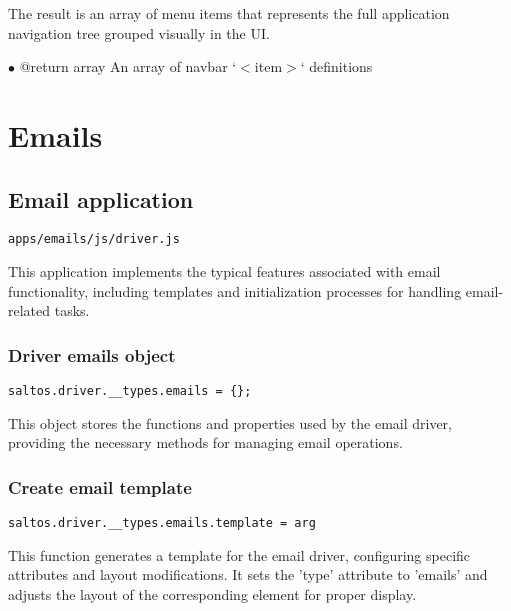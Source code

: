 \documentclass[a4paper]{article}
\begin{document}
The result is an array of menu items that represents the full application
navigation tree grouped visually in the UI.

\begin{compactitem}
\item[\color{myblue}$\bullet$] @return array An array of navbar `$<$item$>$` definitions
\end{compactitem}


\hypertarget{toc48}{}
\section{Emails}

\hypertarget{toc49}{}
\subsection{Email application}

\begin{lstlisting}
apps/emails/js/driver.js
\end{lstlisting}

This application implements the typical features associated with email functionality,
including templates and initialization processes for handling email-related tasks.

\hypertarget{toc50}{}
\subsubsection{Driver emails object}

\begin{lstlisting}
saltos.driver.__types.emails = {};
\end{lstlisting}

This object stores the functions and properties used by the email driver,
providing the necessary methods for managing email operations.

\hypertarget{toc51}{}
\subsubsection{Create email template}

\begin{lstlisting}
saltos.driver.__types.emails.template = arg
\end{lstlisting}

This function generates a template for the email driver, configuring specific
attributes and layout modifications. It sets the 'type' attribute to 'emails'
and adjusts the layout of the corresponding element for proper display.
\end{document}
